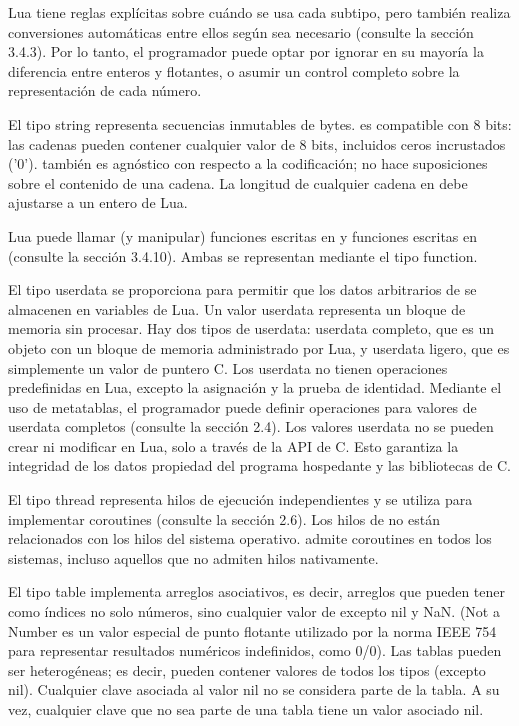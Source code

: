 Lua tiene reglas explícitas sobre cuándo se usa cada subtipo, pero también realiza conversiones automáticas entre ellos según sea necesario (consulte la sección 3.4.3). Por lo tanto, el programador puede optar por ignorar en su mayoría la diferencia entre enteros y flotantes, o asumir un control completo sobre la representación de cada número.

El tipo string representa secuencias inmutables de bytes.  es compatible con 8 bits: las cadenas pueden contener cualquier valor de 8 bits, incluidos ceros incrustados ('0').  también es agnóstico con respecto a la codificación; no hace suposiciones sobre el contenido de una cadena. La longitud de cualquier cadena en  debe ajustarse a un entero de Lua.

Lua puede llamar (y manipular) funciones escritas en  y funciones escritas en  (consulte la sección 3.4.10). Ambas se representan mediante el tipo function.

El tipo userdata se proporciona para permitir que los datos arbitrarios de  se almacenen en variables de Lua. Un valor userdata representa un bloque de memoria sin procesar. Hay dos tipos de userdata: userdata completo, que es un objeto con un bloque de memoria administrado por Lua, y userdata ligero, que es simplemente un valor de puntero C. Los userdata no tienen operaciones predefinidas en Lua, excepto la asignación y la prueba de identidad. Mediante el uso de metatablas, el programador puede definir operaciones para valores de userdata completos (consulte la sección 2.4). Los valores userdata no se pueden crear ni modificar en Lua, solo a través de la API de C. Esto garantiza la integridad de los datos propiedad del programa hospedante y las bibliotecas de C.

El tipo thread representa hilos de ejecución independientes y se utiliza para implementar coroutines (consulte la sección 2.6). Los hilos de  no están relacionados con los hilos del sistema operativo.  admite coroutines en todos los sistemas, incluso aquellos que no admiten hilos nativamente.

El tipo table implementa arreglos asociativos, es decir, arreglos que pueden tener como índices no solo números, sino cualquier valor de  excepto nil y NaN. (Not a Number es un valor especial de punto flotante utilizado por la norma IEEE 754 para representar resultados numéricos indefinidos, como 0/0). Las tablas pueden ser heterogéneas; es decir, pueden contener valores de todos los tipos (excepto nil). Cualquier clave asociada al valor nil no se considera parte de la tabla. A su vez, cualquier clave que no sea parte de una tabla tiene un valor asociado nil.

